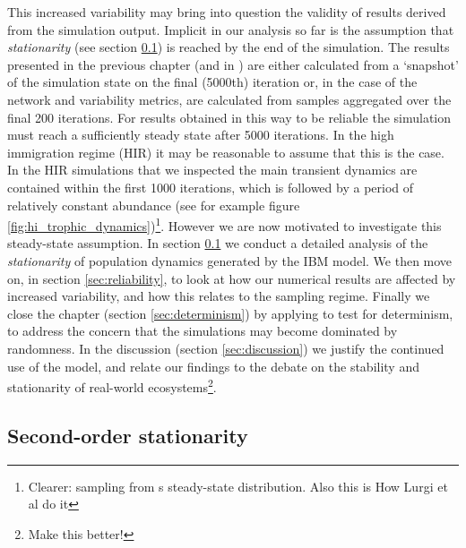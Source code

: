 This increased variability may bring into question the validity of results derived from the simulation output. Implicit in our analysis so far is the assumption that \emph{stationarity} (see section \ref{sec:stationarity}) is reached by the end of the simulation. The results presented in the previous chapter (and in \cite{lurgi2015effects}) are either calculated from a `snapshot' of the simulation state on the final (5000th) iteration or, in the case of the network and variability metrics, are calculated from samples aggregated over the final 200 iterations. For results obtained in this way to be reliable the simulation must reach a sufficiently steady state after 5000 iterations. In the high immigration regime (HIR) it may be reasonable to assume that this is the case. In the HIR simulations that we inspected the main transient dynamics are contained within the first 1000 iterations, which is followed by a period of relatively constant abundance (see for example figure \ref{fig:hi_trophic_dynamics})\footnote{Clearer: sampling from s steady-state distribution. Also this is How Lurgi et al do it}. However we are now motivated to investigate this steady-state assumption. In section \ref{sec:stationarity} we conduct a detailed analysis of the \emph{stationarity} of population dynamics generated by the IBM model. We then move on, in section \ref{sec:reliability}, to look at how our numerical results are affected by increased variability, and how this relates to the sampling regime. Finally we close the chapter (section \ref{sec:determinism}) by applying to test for determinism, to address the concern that the simulations may become dominated by randomness. In the discussion (section \ref{sec:discussion}) we justify the continued use of the model, and relate our findings to the debate on the stability and stationarity of real-world ecosystems\footnote{Make this better!}.
 


\subsection{Second-order stationarity}
\label{sec:stationarity}




